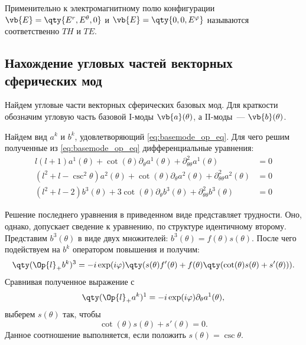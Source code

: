     Применительно к электромагнитному полю конфигурации $\vb{E} = \qty{ E^r, E^\theta, 0 }$ и $\vb{E} = \qty{ 0, 0, E^\varphi }$ называются соответственно\footnotemark{} $TH$ и $TE$.


%
%
%
%
%
%

\subsection{Нахождение угловых частей векторных сферических мод}

    Найдем угловые части векторных сферических базовых мод. Для краткости обозначим угловую часть базовой $\mathrm{I}$-моды $\vb{a}(\theta)$, а $\mathrm{II}$-моды~--- $\vb{b}(\theta)$.

    Найдем вид $a^k$ и $b^k$, удовлетворяющий \autoref{eq:basemode_op_eq}. Для чего решим полученные из \autoref{eq:basemode_op_eq} дифференциальные уравнения:
    \begin{equation}\begin{aligned}
        l (l + 1) a^1(\theta)
            + \cot(\theta) \partial_\theta a^1(\theta)
            + \partial^2_{\theta\theta} a^1(\theta) &= 0 \\
        (l^2 + l - \csc^2\theta) a^2(\theta)
            + \cot(\theta) \partial_\theta a^2(\theta)
            + \partial^2_{\theta\theta} a^2(\theta) &= 0 \\
        (l^2 + l - 2) b^3(\theta)
            + 3 \cot(\theta) \partial_\theta b^3(\theta)
            + \partial^2_{\theta\theta} b^3(\theta) &= 0
    \end{aligned}\end{equation}

    Решение последнего уравнения в приведенном виде представляет трудности. Оно, однако, допускает сведение к уравнению, по структуре идентичному второму. Представим $b^3(\theta)$ в виде двух множителей: $b^3(\theta) = f(\theta) s(\theta)$. После чего подействуем на $b^k$ оператором повышения и получим:
    \begin{equation}
        \qty(\Op{l}_{+} b^k)^3 = - i \exp(i \varphi) \qty(
            s(\theta) f'(\theta) + f(\theta) \qty(\cot(\theta) s(\theta) + s'(\theta))
        ) .
    \end{equation}
    Сравнивая полученное выражение с
    \begin{equation}
        \qty(\Op{l}_{+} a^k)^1 = - i \exp(i \varphi) \partial_\theta a^1(\theta) ,
    \end{equation}
    выберем $s(\theta)$ так, чтобы
    \begin{equation}
        \cot(\theta) s(\theta) + s'(\theta) = 0 .
    \end{equation}
    Данное соотношение выполняется, если положить $s(\theta) = \csc\theta$.

